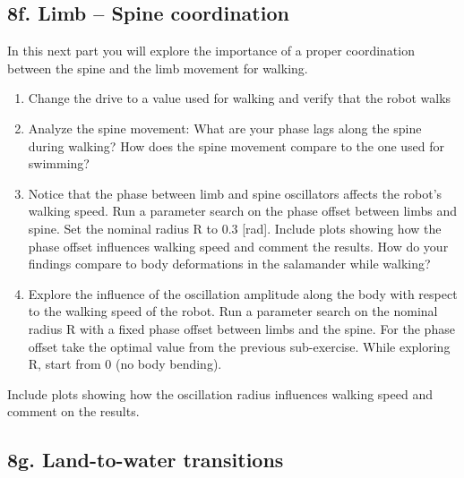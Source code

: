 \documentclass{cmc}
\begin{document}
\subsection*{8f. Limb – Spine coordination}
\label{sec:limb-spine-coordination}

In this next part you will explore the importance of a proper coordination
between the spine and the limb movement for walking.

\begin{enumerate}
\item Change the drive to a value used for walking and verify that the robot
  walks
\item Analyze the spine movement: What are your phase lags along the spine
  during walking? How does the spine movement compare to the one used for
  swimming?
\item Notice that the phase between limb and spine oscillators affects the
  robot’s walking speed. Run a parameter search on the phase offset between
  limbs and spine. Set the nominal radius R to 0.3 [rad]. Include plots showing
  how the phase offset influences walking speed and comment the results. How do
  your findings compare to body deformations in the salamander while walking?
\item Explore the influence of the oscillation amplitude along the body with
  respect to the walking speed of the robot. Run a parameter search on the
  nominal radius R with a fixed phase offset between limbs and the spine. For
  the phase offset take the optimal value from the previous sub-exercise. While
  exploring R, start from 0 (no body bending).
\end{enumerate}

Include plots showing how the oscillation radius influences walking speed and
comment on the results.



\subsection*{8g. Land-to-water transitions}
\end{document}
